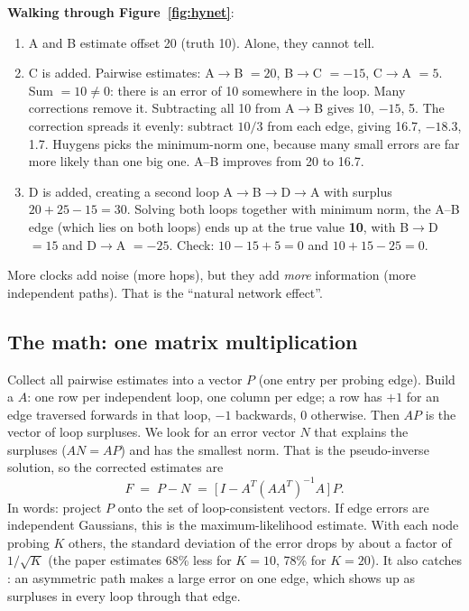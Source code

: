 \textbf{Walking through Figure~\ref{fig:hynet}}:
\begin{enumerate}
  \item[(a)] A and B estimate offset 20 (truth 10). Alone, they cannot tell.
  \item[(b)] C is added. Pairwise estimates: A$\to$B $= 20$, B$\to$C $= -15$, C$\to$A $= 5$. Sum $= 10 \neq 0$: there is an error of 10 somewhere in the loop.
        Many corrections remove it. Subtracting all 10 from A$\to$B gives 10, $-15$, 5. The  correction spreads it evenly: subtract
        $10/3$ from each edge, giving 16.7, $-18.3$, 1.7. Huygens picks the minimum-norm one, because many small errors are far more likely than one big one.
        A--B improves from 20 to 16.7.
  \item[(c)] D is added, creating a second loop A$\to$B$\to$D$\to$A with surplus $20 + 25 - 15 = 30$. Solving both loops together with minimum norm, the
        A--B edge (which lies on both loops) ends up at the true value \textbf{10}, with B$\to$D $= 15$ and D$\to$A $= -25$. Check: $10 - 15 + 5 = 0$ and
        $10 + 15 - 25 = 0$.
\end{enumerate}
More clocks add noise (more hops), but they add \emph{more} information (more independent paths). That is the ``natural network effect''.

\subsection{The math: one matrix multiplication}
Collect all pairwise estimates into a vector $P$ (one entry per probing edge). Build a  $A$: one row per independent loop, one
column per edge; a row has $+1$ for an edge traversed forwards in that loop, $-1$ backwards, 0 otherwise. Then $AP$ is the vector of loop surpluses.
We look for an error vector $N$ that explains the surpluses ($AN = AP$) and has the smallest norm. That is the pseudo-inverse solution, so the
corrected estimates are
\[
F \;=\; P - N \;=\; \big[\,I - A^{T}(AA^{T})^{-1}A\,\big]\,P .
\]
In words: project $P$ onto the set of loop-consistent vectors. If edge errors are independent Gaussians, this is the maximum-likelihood estimate.
With each node probing $K$ others, the standard deviation of the error drops by about a factor of $1/\sqrt{K}$ (the paper estimates 68\% less for $K=10$,
78\% for $K=20$). It also catches : an asymmetric path makes a large error on one edge, which shows up as surpluses in every loop
through that edge.

